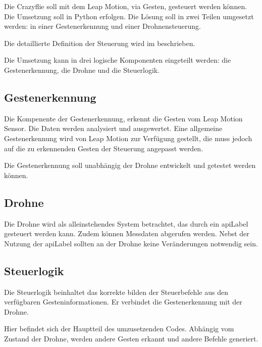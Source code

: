 Die Crazyflie soll mit dem Leap Motion, via Gesten, gesteuert werden können.
Die Umsetzung soll in Python erfolgen.
Die Lösung soll in zwei Teilen umgesetzt werden: in einer Gestenerkennung und einer Drohnensteuerung.

Die detaillierte Definition der Steuerung wird im  beschrieben.

Die Umsetzung kann in drei logische Komponenten eingeteilt werden: die Gestenerkennung, die Drohne und die Steuerlogik.

\subsection{Gestenerkennung}
Die Kompenente der Gestenerkennung, erkennt die Gesten vom Leap Motion Sensor. Die Daten werden analysiert und ausgewertet.
Eine allgemeine Gestenerkennung wird von Leap Motion zur Verfügung gestellt, die muss jedoch auf die zu erkennenden Gesten der Steuerung angepasst werden.

Die Gestenerkennung soll unabhängig der Drohne entwickelt und getestet werden können.

\subsection{Drohne}
Die Drohne wird als alleinstehendes System betrachtet, das durch ein \gls{apiLabel} gesteuert werden kann. Zudem können Messdaten abgerufen werden. Nebst der Nutzung der \gls{apiLabel} sollten an der Drohne keine Veränderungen notwendig sein.

\subsection{Steuerlogik}
Die Steuerlogik beinhaltet das korrekte bilden der Steuerbefehle aus den verfügbaren Gesteninformationen.
Er verbindet die Gestenerkennung mit der Drohne.

Hier befindet sich der Hauptteil des umzusetzenden Codes. Abhängig vom Zustand der Drohne, werden andere Gesten erkannt und andere Befehle generiert.

